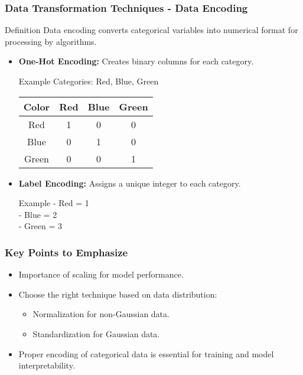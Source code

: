 \documentclass[aspectratio=169]{beamer}
\begin{document}
\begin{frame}[fragile]
    \frametitle{Data Transformation Techniques - Data Encoding}
    \begin{block}{Definition}
        Data encoding converts categorical variables into numerical format for processing by algorithms.
    \end{block}
    \begin{itemize}
        \item \textbf{One-Hot Encoding:} Creates binary columns for each category.
        \begin{block}{Example}
            Categories: {Red, Blue, Green} \\
            \begin{tabular}{|c|c|c|c|}
                \hline
                Color & Red & Blue & Green \\
                \hline
                Red   & 1   & 0    & 0     \\
                Blue  & 0   & 1    & 0     \\
                Green & 0   & 0    & 1     \\
                \hline
            \end{tabular}
        \end{block}
        \item \textbf{Label Encoding:} Assigns a unique integer to each category.
        \begin{block}{Example}
            - Red = 1 \\
            - Blue = 2 \\
            - Green = 3
        \end{block}
    \end{itemize}
\end{frame}

\begin{frame}[fragile]
    \frametitle{Key Points to Emphasize}
    \begin{itemize}
        \item Importance of scaling for model performance.
        \item Choose the right technique based on data distribution:
        \begin{itemize}
            \item Normalization for non-Gaussian data.
            \item Standardization for Gaussian data.
        \end{itemize}
        \item Proper encoding of categorical data is essential for training and model interpretability.
    \end{itemize}
\end{frame}
\end{document}
